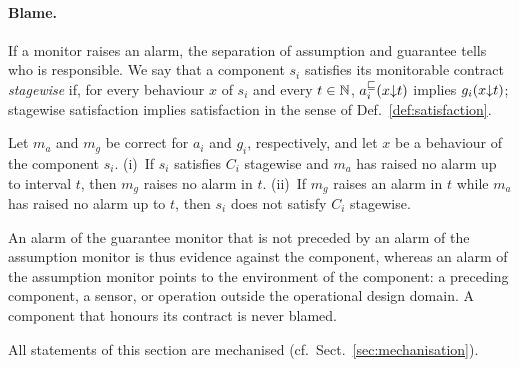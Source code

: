 \paragraph{Blame.}
If a monitor raises an alarm, the separation of assumption and guarantee tells who is responsible. We say that a component $s_i$ satisfies its monitorable contract \emph{stagewise} if, for every behaviour $x$ of $s_i$ and every $t \in \mathbb{N}$, $a_i^{\sqsubseteq}(x{\downarrow}t)$ implies $g_i(x{\downarrow}t)$; stagewise satisfaction implies satisfaction in the sense of Def.~\ref{def:satisfaction}.

\begin{theorem}[Blame]\label{thm:blame}
  Let $m_a$ and $m_g$ be correct for $a_i$ and $g_i$, respectively, and let $x$ be a behaviour of the component $s_i$. (i)~If $s_i$ satisfies $C_i$ stagewise and $m_a$ has raised no alarm up to interval $t$, then $m_g$ raises no alarm in $t$. (ii)~If $m_g$ raises an alarm in $t$ while $m_a$ has raised no alarm up to $t$, then $s_i$ does not satisfy $C_i$ stagewise.
\end{theorem}

\noindent
An alarm of the guarantee monitor that is not preceded by an alarm of the assumption monitor is thus evidence against the component, whereas an alarm of the assumption monitor points to the environment of the component: a preceding component, a sensor, or operation outside the operational design domain. A component that honours its contract is never blamed.

All statements of this section are mechanised (cf.\ Sect.~\ref{sec:mechanisation}).
